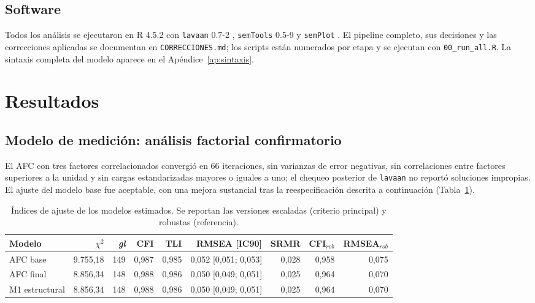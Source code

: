\documentclass[11pt,a4paper]{article}
\newcommand{\chisq}{$\chi^2$}
\newcommand{\df}{\textit{gl}}
\begin{document}
\subsection{Software}

Todos los análisis se ejecutaron en R 4.5.2 \citep{rcore2025} con \texttt{lavaan} 0.7-2
\citep{rosseel2012}, \texttt{semTools} 0.5-9 \citep{jorgensen2022} y \texttt{semPlot}
\citep{epskamp2015}. El pipeline completo, sus decisiones y las correcciones aplicadas se
documentan en \texttt{CORRECCIONES.md}; los scripts están numerados por etapa y se ejecutan
con \texttt{00\_run\_all.R}. La sintaxis completa del modelo aparece en el Apéndice~\ref{ap:sintaxis}.

\section{Resultados}\label{sec:resultados}

\subsection{Modelo de medición: análisis factorial confirmatorio}

El AFC con tres factores correlacionados convergió en 66 iteraciones, sin varianzas de error
negativas, sin correlaciones entre factores superiores a la unidad y sin cargas
estandarizadas mayores o iguales a uno; el chequeo posterior de \texttt{lavaan} no reportó
soluciones impropias. El ajuste del modelo base fue aceptable, con una mejora sustancial tras
la reespecificación descrita a continuación (Tabla~\ref{tab:ajuste}).

\begin{table}[htbp]
\centering
\caption{Índices de ajuste de los modelos estimados. Se reportan las versiones escaladas
(criterio principal) y robustas (referencia).}
\label{tab:ajuste}
\small
\begin{tabular}{@{}lrrrrrrrr@{}}
\toprule
Modelo & \chisq & \df & CFI & TLI & RMSEA [IC90] & SRMR & CFI$_{rob}$ & RMSEA$_{rob}$ \\
\midrule
AFC base & 9.755,18 & 149 & 0,987 & 0,985 & 0,052 [0,051; 0,053] & 0,028 & 0,958 & 0,075 \\
AFC final & 8.856,34 & 148 & 0,988 & 0,986 & 0,050 [0,049; 0,051] & 0,025 & 0,964 & 0,070 \\
M1 estructural & 8.856,34 & 148 & 0,988 & 0,986 & 0,050 [0,049; 0,051] & 0,025 & 0,964 & 0,070 \\
\bottomrule
\end{tabular}
\end{table}
\end{document}
